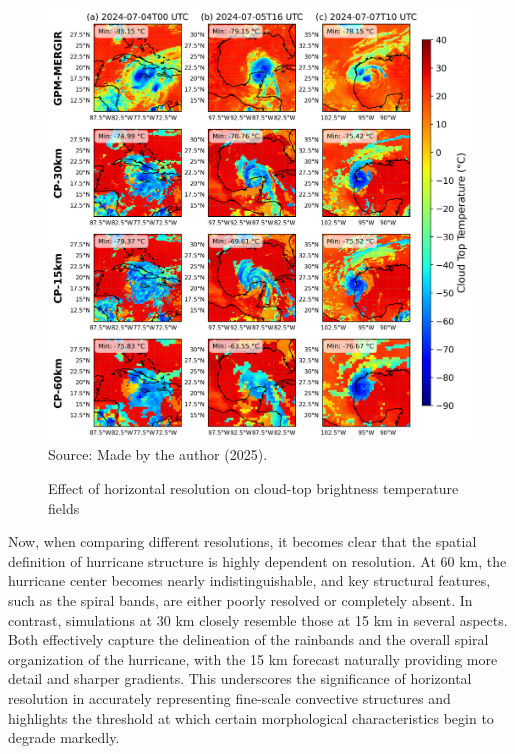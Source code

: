 \begin{figure}[!ht]
	\centering
	\caption{Effect of horizontal resolution on cloud-top brightness temperature fields} %
	\includegraphics[width=\textwidth]{docs/figuras/chapter5/painel_ctt_native_resolution_FINAL.png} 
	\vspace{0.5em}
	Source: Made by the author (2025).  %
	\label{fig:snapmorph2} %
\end{figure}

Now, when comparing different resolutions, it becomes clear that the spatial definition of hurricane structure is highly dependent on resolution. At 60 km, the hurricane center becomes nearly indistinguishable, and key structural features, such as the spiral bands, are either poorly resolved or completely absent. In contrast, simulations at 30 km closely resemble those at 15 km in several aspects. Both effectively capture the delineation of the rainbands and the overall spiral organization of the hurricane, with the 15 km forecast naturally providing more detail and sharper gradients. This underscores the significance of horizontal resolution in accurately representing fine-scale convective structures and highlights the threshold at which certain morphological characteristics begin to degrade markedly.

